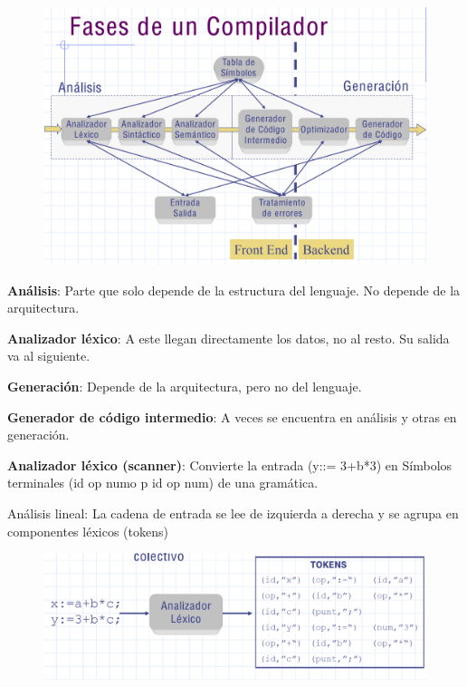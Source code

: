 \documentclass[12pt]{report} %
\begin{document}
\begin{figure}[H]
	{\includegraphics[scale=.27]{Untitled 11.png}}
\end{figure}

\textbf{Análisis}: Parte que solo depende de la estructura del lenguaje.
No depende de la arquitectura.

\textbf{Analizador léxico}: A este llegan directamente los datos, no al
resto. Su salida va al siguiente.

\textbf{Generación}: Depende de la arquitectura, pero no del lenguaje.

\textbf{Generador de código intermedio}: A veces se encuentra en
análisis y otras en generación.

\textbf{Analizador léxico (scanner)}: Convierte la entrada (y::= 3+b*3)
en Símbolos terminales (id op numo p id op num) de una gramática.

Análisis lineal: La cadena de entrada se lee de izquierda a derecha y se
agrupa en componentes léxicos (tokens)

\begin{figure}[H]
	{\includegraphics[scale=.25]{Untitled 12.png}}
\end{figure}
\end{document}
